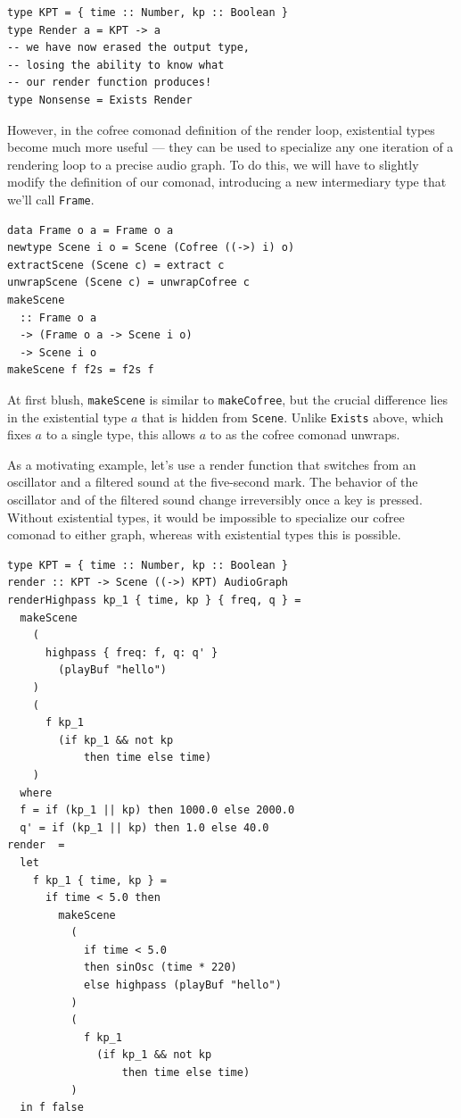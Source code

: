 \documentclass{article}
\begin{document}
\lstset{language=Haskell, style=psstyle}
\begin{lstlisting}
type KPT = { time :: Number, kp :: Boolean }
type Render a = KPT -> a
-- we have now erased the output type,
-- losing the ability to know what
-- our render function produces!
type Nonsense = Exists Render
\end{lstlisting}

However, in the cofree comonad definition of the render loop, existential types become much more useful --- they can be used to specialize any one iteration of a rendering loop to a precise audio graph. To do this, we will have to slightly modify the definition of our comonad, introducing a new intermediary type that we'll call \texttt{Frame}.

\lstset{language=Haskell, style=psstyle}
\begin{lstlisting}
data Frame o a = Frame o a
newtype Scene i o = Scene (Cofree ((->) i) o)
extractScene (Scene c) = extract c
unwrapScene (Scene c) = unwrapCofree c
makeScene
  :: Frame o a
  -> (Frame o a -> Scene i o)
  -> Scene i o
makeScene f f2s = f2s f
\end{lstlisting}

At first blush, \texttt{makeScene} is similar to \texttt{makeCofree}, but the crucial difference lies in the existential type $a$ that is hidden from \texttt{Scene}. Unlike \texttt{Exists} above, which fixes $a$ to a single type, this allows $a$ to as the cofree comonad unwraps.

As a motivating example, let's use a render function that switches from an oscillator and a filtered sound at the five-second mark. The behavior of the oscillator and of the filtered sound change irreversibly once a key is pressed. Without existential types, it would be impossible to specialize our cofree comonad to either graph, whereas with existential types this is possible.

\lstset{language=Haskell, style=psstyle}
\begin{lstlisting}
type KPT = { time :: Number, kp :: Boolean }
render :: KPT -> Scene ((->) KPT) AudioGraph
renderHighpass kp_1 { time, kp } { freq, q } =
  makeScene
    (
      highpass { freq: f, q: q' }
        (playBuf "hello")
    )
    (
      f kp_1
        (if kp_1 && not kp
            then time else time)
    )
  where
  f = if (kp_1 || kp) then 1000.0 else 2000.0
  q' = if (kp_1 || kp) then 1.0 else 40.0
render  =
  let
    f kp_1 { time, kp } =
      if time < 5.0 then
        makeScene
          (
            if time < 5.0
            then sinOsc (time * 220)
            else highpass (playBuf "hello")
          )
          (
            f kp_1
              (if kp_1 && not kp
                  then time else time)
          )
  in f false
\end{lstlisting}
\end{document}
